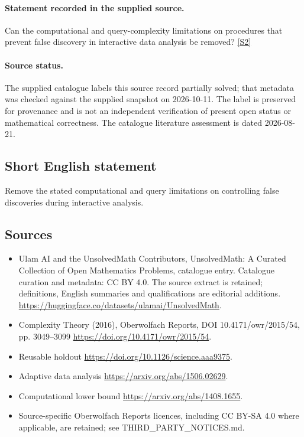 \documentclass[11pt]{article}
\begin{document}
\paragraph{Statement recorded in the supplied source.}
Can the computational and query-complexity limitations on procedures that prevent false discovery in interactive data analysis be removed? \href{https://doi.org/10.4171/owr/2015/54}{[S2]}
\paragraph{Source status.}
The supplied catalogue labels this source record partially solved; that metadata was checked against the supplied snapshot on 2026-10-11. The label is preserved for provenance and is not an independent verification of present open status or mathematical correctness. The catalogue literature assessment is dated 2026-08-21.
\subsection{Short English statement}
Remove the stated computational and query limitations on controlling false discoveries during interactive analysis.
\subsection{Sources}
\begin{itemize}
\item[S1] Ulam AI and the UnsolvedMath Contributors, UnsolvedMath: A Curated Collection of Open Mathematics Problems, catalogue entry. Catalogue curation and metadata: CC BY 4.0. The source extract is retained; definitions, English summaries and qualifications are editorial additions.
\url{https://huggingface.co/datasets/ulamai/UnsolvedMath}.
\item[S2] Complexity Theory (2016), Oberwolfach Reports, DOI 10.4171/owr/2015/54, pp. 3049--3099
\url{https://doi.org/10.4171/owr/2015/54}.
\item[S3] Reusable holdout
\url{https://doi.org/10.1126/science.aaa9375}.
\item[S4] Adaptive data analysis
\url{https://arxiv.org/abs/1506.02629}.
\item[S5] Computational lower bound
\url{https://arxiv.org/abs/1408.1655}.
\item Source-specific Oberwolfach Reports licences, including CC BY-SA 4.0 where applicable, are retained; see THIRD\_PARTY\_NOTICES.md.
\end{itemize}
\end{document}
